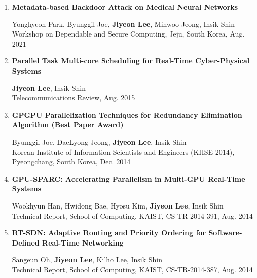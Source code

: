\documentclass[11pt,letterpaper]{article}
\begin{document}
\begin{enumerate}

	\item \textbf{Metadata-based Backdoor Attack on Medical Neural Networks} \\
	\begin{small}
		Yonghyeon Park, Byunggil Joe, \textbf{Jiyeon Lee}, Minwoo Jeong, Insik Shin\\ 
		Workshop on Dependable and Secure Computing, Jeju, South Korea, Aug. 2021
	\end{small}

	\item \textbf{Parallel Task Multi-core Scheduling for Real-Time Cyber-Physical Systems} \\
	\begin{small}
		\textbf{Jiyeon Lee}, Insik Shin\\ 
		Telecommunications Review, Aug. 2015
	\end{small}
	
	\item \textbf{GPGPU Parallelization Techniques for Redundancy Elimination Algorithm (Best Paper Award)} \\
	\begin{small}
		Byunggil Joe, DaeLyong Jeong, \textbf{Jiyeon Lee}, Insik Shin\\ 
		Korean Institute of Information Scientists and Engineers (KIISE 2014), Pyeongchang, South Korea, Dec. 2014
	\end{small}

	\item \textbf{GPU-SPARC: Accelerating Parallelism in Multi-GPU Real-Time Systems} \\
	\begin{small}
		Wookhyun Han, Hwidong Bae, Hyosu Kim, \textbf{Jiyeon Lee}, Insik Shin\\ 
		Technical Report, School of Computing, KAIST, CS-TR-2014-391, Aug. 2014
	\end{small}
	
	\item \textbf{RT-SDN: Adaptive Routing and Priority Ordering for Software-Defined Real-Time Networking} \\
	\begin{small}
		Sangeun Oh, \textbf{Jiyeon Lee}, Kilho Lee, Insik Shin\\ 
		Technical Report, School of Computing, KAIST, CS-TR-2014-387, Aug. 2014
	\end{small}
	

\end{enumerate}
\end{document}
